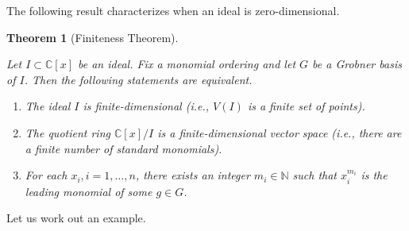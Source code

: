 \documentclass[
]{book}
\newtheorem{theorem}{Theorem}[chapter]
\theoremstyle{definition}
\theoremstyle{definition}
\theoremstyle{definition}
\theoremstyle{definition}
\theoremstyle{remark}
\begin{document}
The following result characterizes when an ideal is zero-dimensional.

\begin{theorem}[Finiteness Theorem]
\protect\hypertarget{thm:FiniteTheorem}{}\label{thm:FiniteTheorem}

Let \(I \subset \mathbb{C}[x]\) be an ideal. Fix a monomial ordering and let \(G\) be a Grobner basis of \(I\). Then the following statements are equivalent.

\begin{enumerate}
\def\labelenumi{\arabic{enumi}.}
\item
  The ideal \(I\) is finite-dimensional (i.e., \(V(I)\) is a finite set of points).
\item
  The quotient ring \(\mathbb{C}[x]/I\) is a finite-dimensional vector space (i.e., there are a finite number of standard monomials).
\item
  For each \(x_i, i=1,\dots,n\), there exists an integer \(m_i \in \mathbb{N}\) such that \(x_i^{m_i}\) is the leading monomial of some \(g \in G\).
\end{enumerate}

\end{theorem}

Let us work out an example.
\end{document}
